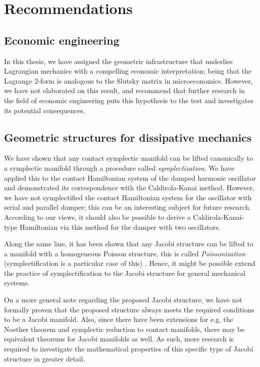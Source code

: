 \section*{Recommendations}

\subsection*{Economic engineering}
In this thesis, we have assigned the geometric infrastructure that underlies Lagrangian mechanics with a compelling economic interpretation; being that the Lagrange 2-form is analogous to the Slutsky matrix in microeconomics. However, we have not elaborated on this result, and recommend that further research in the field of economic engineering puts this hypothesis to the test and investigates its potential consequences.

\subsection*{Geometric structures for dissipative mechanics}
We have shown that any contact symplectic manifold can be lifted canonically to a symplectic manifold through a procedure called \emph{symplectization}. We have applied this to the contact Hamiltonian system of the damped harmonic oscillator and demonstrated its correspondence with the Caldirola-Kanai method. However, we have not symplectified the contact Hamiltonian system for the oscillator with serial and parallel damper; this can be an interesting subject for future research. According to our views, it should also be possible to derive a Caldirola-Kanai-type Hamiltonian via this method for the damper with two oscillators.

Along the same line, it has been shown that any Jacobi structure can be lifted to a manifold with a homogeneous Poisson structure, this is called \emph{Poissonization} (symplectification is a particular case of this) \cite{marle1991}. Hence, it might be possible extend the practice of symplectification to the Jacobi structure for general mechanical systems. 

On a more general note regarding the proposed Jacobi structure, we have not formally proven that the proposed structure always meets the required conditions to be a Jacobi manifold. Also, since there have been extensions for e.g. the Noether theorem and symplectic reduction to contact manifolds, there may be equivalent theorems for Jacobi manifolds as well. As such, more research is required to investigate the mathematical properties of this specific type of Jacobi structure in greater detail.

